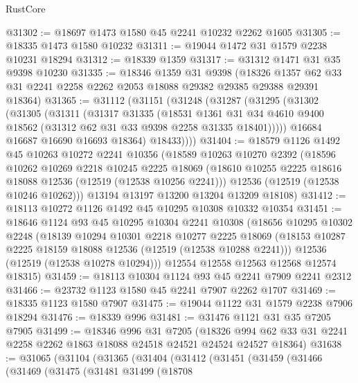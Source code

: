\begin{lexlean}{RustCore}
\begin{coremodule}
@31302 := @18697 @1473 @1580 @45 @2241 @10232 @2262 @1605
@31305 := @18335 @1473 @1580 @10232
@31311 := @19044 @1472 @31 @1579 @2238 @10231 @18294
@31312 := @18339 @1359
@31317 := @31312 @1471 @31 @35 @9398 @10230
@31335 := @18346
    @1359
    @31
    @9398
    (@18326 @1357 @62 @33 @31 @2241 @2258 @2262 @2053 @18088 @29382 @29385 @29388 @29391 @18364)
@31365 := @31112
    (@31151
      (@31248
        (@31287
          (@31295
            (@31302
              (@31305
                (@31311
                  (@31317
                    @31335
                    (@18531
                      @1361
                      @31
                      @34
                      @4610
                      @9400
                      @18562
                      (@31312 @62 @31 @33 @9398 @2258 @31335 @18401)))))
              @16684
              @16687
              @16690
              @16693
              @18364)
            @18433))))
@31404 := @18579
    @1126
    @1492
    @45
    @10263
    @10272
    @2241
    @10356
    (@18589
      @10263
      @10270
      @2392
      (@18596
        @10262
        @10269
        @2218
        @10245
        @2225
        @18069
        (@18610 @10255 @2225 @18616 @18088 @12536 (@12519 (@12538 @10256 @2241)))
        @12536
        (@12519 (@12538 @10246 @10262)))
      @13194
      @13197
      @13200
      @13204
      @13209
      @18108)
@31412 := @18113 @10272 @1126 @1492 @45 @10295 @10308 @10332 @10354
@31451 := @18646
    @1124
    @93
    @45
    @10295
    @10304
    @2241
    @10308
    (@18656
      @10295
      @10302
      @2248
      (@18139
        @10294
        @10301
        @2218
        @10277
        @2225
        @18069
        (@18153 @10287 @2225 @18159 @18088 @12536 (@12519 (@12538 @10288 @2241)))
        @12536
        (@12519 (@12538 @10278 @10294)))
      @12554
      @12558
      @12563
      @12568
      @12574
      @18315)
@31459 := @18113 @10304 @1124 @93 @45 @2241 @7909 @2241 @2312
@31466 := @23732 @1123 @1580 @45 @2241 @7907 @2262 @1707
@31469 := @18335 @1123 @1580 @7907
@31475 := @19044 @1122 @31 @1579 @2238 @7906 @18294
@31476 := @18339 @996
@31481 := @31476 @1121 @31 @35 @7205 @7905
@31499 := @18346
    @996
    @31
    @7205
    (@18326 @994 @62 @33 @31 @2241 @2258 @2262 @1863 @18088 @24518 @24521 @24524 @24527 @18364)
@31638 := @31065
    (@31104
      (@31365
        (@31404
          (@31412
            (@31451
              (@31459
                (@31466
                  (@31469
                    (@31475
                      (@31481
                        @31499
                        (@18708

\end{coremodule}
\end{lexlean}

